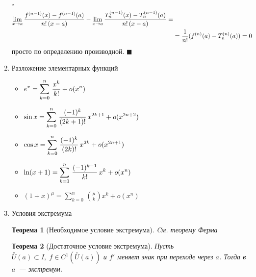 \documentclass[a4paper,12pt]{article}
\theoremstyle{plain}
\newtheorem{thrm}{Теорема}
\theoremstyle{definition}
\theoremstyle{remark}
\newenvironment{ittproof}{$\square$ }{ $\blacksquare$ \\}
\def\resetdefs{ \setcounter{defn}{0}\setcounter{exmp}{0} }
\def\resetthrm{ \setcounter{thrm}{0}\setcounter{stat}{0} }
\def\resetrem{ \setcounter{rem}{0} }
\def\resetall{ \resetdefs \resetthrm \resetrem}
\def\itemrange#1{%
  \addtocounter{enumi}{1}%
  \edef\labelenumi{\theenumi--\noexpand\theenumi.}%
  \addtocounter{enumi}{-1}%
  \addtocounter{enumi}{#1}%
  \item
  \def\labelenumi{\theenumi.}
}
\begin{document}
\begin{enumerate}
\begin{ittproof}
\begin{align*}
        \lim_{x\to a}{f^{(n-1)}(x) - f^{(n-1)}(a) \over n!\,(x-a)} - 
        \lim_{x\to a}{T_n^{(n-1)}(x) - T_n^{(n-1)}(a) \over n!\,(x-a)} = \\
        &= {1\over n!}(f^{(n)}(a) - T_n^{(n)}(a)) = 0 
      \end{align*} просто по определению производной.
    \end{ittproof}
  \item Разложение элементарных функций
    \begin{itemize}
      \item $\displaystyle e^x = \sum_{k=0}^n\,{x^k\over k!} + o(x^n) $
      \item $\displaystyle \sin x = \sum_{k=0}^n\,{(-1)^k\over (2k+1)!}\,x^{2k+1} + o(x^{2n+2}) $
      \item $\displaystyle \cos x = \sum_{k=0}^n\,{(-1)^k\over (2k)!}\,x^{2k} + o(x^{2n+1}) $
      \item $\displaystyle \ln (x+1) = \sum_{k=1}^n\,{(-1)^{k-1}\over k!}\,x^k + o(x^n) $
      \item $\displaystyle (1+x)^\mu = \sum_{k=0}^n\,\binom \mu k x^k + o(x^n) $
    \end{itemize}
  \itemrange{1} Условия экстремума
    \resetall
    \begin{thrm}[Необходимое условие экстремума]
      \label{thrm:necessity}
      Cм. теорему Ферма
    \end{thrm}
    
    \begin{thrm}[Достаточное условие экстремума]
      \label{thrm:adequacy}
      Пусть  $\overset{\circ}{U}(a)\subset I,\;f\in C^1(\overset{\circ}{U}(a))$ 
      и $f'$ меняет знак при переходе через $a$. Тогда в $a$~--- экстремум. 
    \end{thrm}
    

\end{enumerate}
\end{document}
